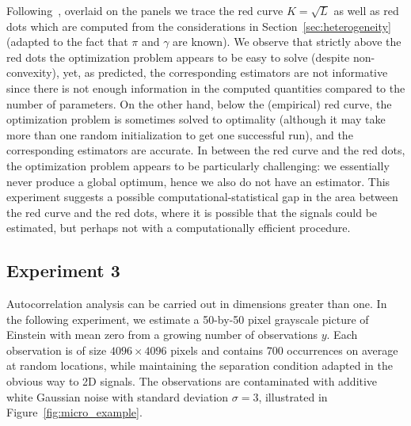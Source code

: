 \documentclass[12pt]{article}
\newcommand{\1}{\mathbf{1}}
\theoremstyle{plain}
\theoremstyle{definition}
\theoremstyle{remark}
\theoremstyle{plain}
\theoremstyle{remark}
\theoremstyle{plain}
\theoremstyle{plain}
\theoremstyle{plain}
\numberwithin{equation}{section}
\begin{document}
Following~\cite{boumal2017heterogeneous}, overlaid on the panels we trace the red curve $K = \sqrt{L}$ as well as red dots which are computed from the considerations in Section~\ref{sec:heterogeneity} (adapted to the fact that $\pi$ and $\gamma$ are known). We observe that strictly above the red dots the optimization problem appears to be easy to solve (despite non-convexity), yet, as predicted, the corresponding estimators are not informative since there is not enough information in the computed quantities compared to the number of parameters. On the other hand, below the (empirical) red curve, the optimization problem is sometimes solved to optimality (although it may take more than one random initialization to get one successful run), and the corresponding estimators are accurate. In between the red curve and the red dots, the optimization problem appears to be particularly challenging: we essentially never produce a global optimum, hence we also do not have an estimator. This experiment suggests a possible computational-statistical gap in the area between the red curve and the red dots, where it is possible that the signals could be estimated, but perhaps not with a computationally efficient procedure.

\subsection{Experiment 3}

Autocorrelation analysis can be carried out in dimensions greater than one. In the following experiment, we estimate 
a 50-by-50 pixel grayscale picture of Einstein with mean zero from a growing number of observations $y$. Each observation is of size $4096\times 4096$ pixels and contains 700 occurrences on average at random locations, while maintaining the separation condition adapted in the obvious way to 2D signals.
The observations are contaminated with additive white Gaussian noise with standard deviation $\sigma = 3$, illustrated in Figure~\ref{fig:micro_example}. 
\end{document}
